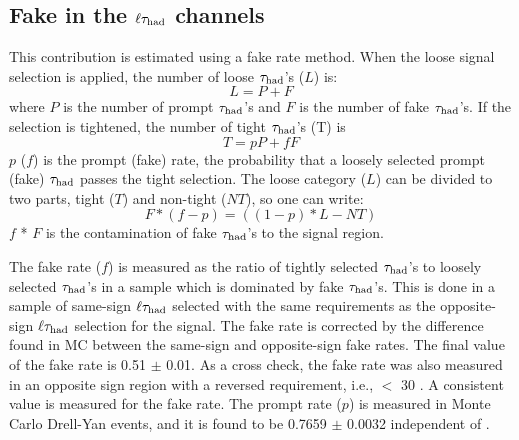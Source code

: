 \subsection{\texorpdfstring{Fake \Tau in the $\ell\tau_{\rm had}$ channels}{Fake tau the in lepton-tau channels}}

This contribution is estimated using a fake rate method.
When the loose signal selection is applied, the number of loose $\tau_{\rm had}$'s ($L$) is:
\begin{equation}
L = P + F
\end{equation}
where $P$ is the number of prompt $\tau_{\rm had}$'s and $F$ is the number of fake 
$\tau_{\rm had}$'s. If the selection is tightened, the number of tight $\tau_{\rm had}$'s (T) is
\begin{equation}
 T = pP + fF
\end{equation} 
$p$ ($f$) is the prompt (fake) rate, the probability that a loosely selected prompt (fake) $\tau_{\rm had}$ passes the  tight  selection. 
The loose category ($L$) can be divided to two parts, 
tight ($T$) and non-tight ($NT$), so one can write:
\begin{equation}
   F * (f - p) = ((1 - p) * L - NT)
\end{equation}
$f$ * $F$ is the contamination of fake $\tau_{\rm had}$'s to the signal region. 

The fake rate ($f$) is measured as the ratio of tightly selected $\tau_{\rm had}$'s to loosely 
selected $\tau_{\rm had}$'s in a sample which is dominated by fake $\tau_{\rm had}$'s. This is done in a sample of same-sign $\ell\tau_{\rm had}$ selected 
with the same requirements as the opposite-sign $\ell\tau_{\rm had}$
selection for the signal.
The fake rate is corrected by the difference found in MC between the 
same-sign and opposite-sign fake rates.
The final value of the fake rate is 0.51 $\pm$ 0.01. 
As a cross check, the fake rate was also measured in an opposite sign region with a reversed
\MET requirement, i.e., \MET $<$ 30 \GeV.
A consistent value is measured for the fake rate.  
The prompt rate ($p$) is measured in Monte Carlo Drell-Yan events, and it is found to 
be 0.7659 $\pm$ 0.0032 independent of \mttwo. 

